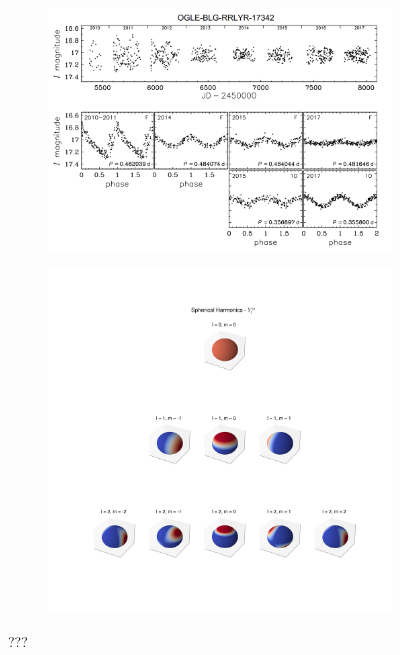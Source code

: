         \begin{figure}[H]
        \centering
        \begin{subfigure}{.45\textwidth}
            \centering
            \includegraphics[width=\textwidth]{report/images/chap2_foundations/double_mode.png}
            \vspace{2em}
        \end{subfigure}%
        \begin{subfigure}{.45\textwidth}
            \centering
            \includegraphics[width=\textwidth]{report/images/chap2_foundations/spherical_harmonics.png}
        \end{subfigure}
        \caption{???}
        \label{2.3c}
        \end{figure}
        
